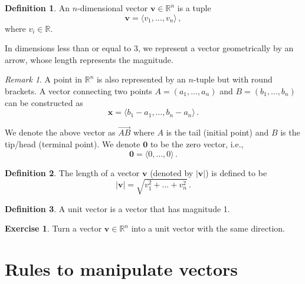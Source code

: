\documentclass[
]{book}
\theoremstyle{definition}
\newtheorem{definition}{Definition}[chapter]
\theoremstyle{definition}
\theoremstyle{definition}
\newtheorem{exercise}{Exercise}[chapter]
\theoremstyle{definition}
\theoremstyle{remark}
\newtheorem*{remark}{Remark}
\begin{document}
\begin{definition}
An \(n\)-dimensional vector \(\textbf{v}\in \mathbb{R}^n\) is a tuple
\begin{equation}
    \textbf{v} = \langle v_1,\dots, v_n \rangle \,,
\end{equation}
where \(v_i \in \mathbb{R}\).
\end{definition}

In dimensions less than or equal to 3, we represent a vector
geometrically by an arrow, whose length represents the magnitude.

\begin{remark}
A point in \(\mathbb{R}^n\) is also represented by an \(n\)-tuple
but with round brackets.
A vector connecting two points \(A= (a_1, \dots, a_n)\)
and \(B=(b_1, \dots, b_n)\) can be constructed as
\begin{equation*}
    \textbf{x} =  \langle b_1-a_1, \dots, b_n - a_n \rangle \,.
\end{equation*}

We denote the above vector as \(\vec{AB}\) where \(A\) is the tail (initial point)
and \(B\) is the tip/head (terminal point).
We denote \(\textbf{0}\) to be the zero vector, i.e.,
\begin{equation*}
    \textbf{0} = \langle 0, \dots, 0 \rangle \,.
\end{equation*}
\end{remark}

\begin{definition}
The length of a vector \(\textbf{v}\) (denoted by \(| \textbf{v}|\)) is defined to be
\begin{equation}
    |\textbf{v}| = \sqrt{ v_1^2 + \dots + v_n^2} \,.
\end{equation}
\end{definition}

\begin{definition}
A unit vector is a vector that has magnitude 1.
\end{definition}

\begin{exercise}
Turn a vector \(\textbf{v} \in \mathbb{R}^n\) into a unit vector with the same
direction.
\end{exercise}

\section*{Rules to manipulate vectors}\label{rules-to-manipulate-vectors}
\end{document}
